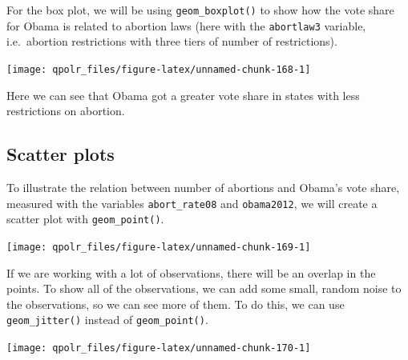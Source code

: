 \documentclass[12pt,oneside]{reedthesis}
\theoremstyle{definition}
\theoremstyle{definition}
\theoremstyle{definition}
\theoremstyle{remark}
\begin{document}
  For the box plot, we will be using \texttt{geom\_boxplot()} to show how
  the vote share for Obama is related to abortion laws (here with the
  \texttt{abortlaw3} variable, i.e.~abortion restrictions with three tiers
  of number of restrictions).
  \begin{Shaded}
  \begin{Highlighting}[]
  \NormalTok{(}\OperatorTok{+}
  \StringTok{  }\NormalTok{() }
  \end{Highlighting}
  \end{Shaded}
  \begin{center}\texttt{[image: qpolr\_files/figure-latex/unnamed-chunk-168-1]} \end{center}
  
  Here we can see that Obama got a greater vote share in states with less
  restrictions on abortion.
  
  \subsection{Scatter plots}\label{scatter-plots}
  
  To illustrate the relation between number of abortions and Obama's vote
  share, measured with the variables \texttt{abort\_rate08} and
  \texttt{obama2012}, we will create a scatter plot with
  \texttt{geom\_point()}.
  \begin{Shaded}
  \begin{Highlighting}[]
  \NormalTok{(}\OperatorTok{+}
  \StringTok{  }\NormalTok{() }
  \end{Highlighting}
  \end{Shaded}
  \begin{center}\texttt{[image: qpolr\_files/figure-latex/unnamed-chunk-169-1]} \end{center}
  
  If we are working with a lot of observations, there will be an overlap
  in the points. To show all of the observations, we can add some small,
  random noise to the observations, so we can see more of them. To do
  this, we can use \texttt{geom\_jitter()} instead of
  \texttt{geom\_point()}.
  \begin{Shaded}
  \begin{Highlighting}[]
  \NormalTok{(}\OperatorTok{+}
  \StringTok{  }\NormalTok{() }
  \end{Highlighting}
  \end{Shaded}
  \begin{center}\texttt{[image: qpolr\_files/figure-latex/unnamed-chunk-170-1]} \end{center}
  
\end{document}
